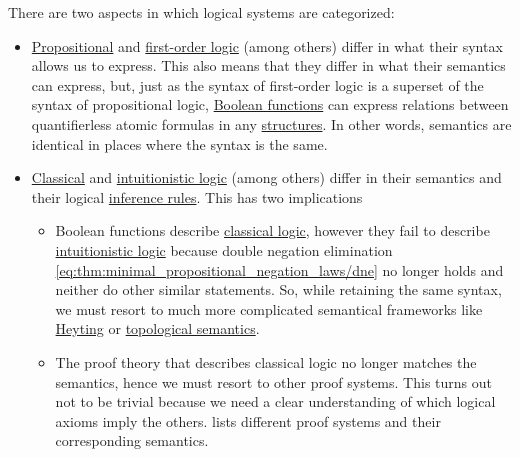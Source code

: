 There are two aspects in which logical systems are categorized:
\begin{itemize}
  \item \hyperref[subsec:propositional_logic]{Propositional} and \hyperref[subsec:first_order_logic]{first-order logic} (among others) differ in what their syntax allows us to express. This also means that they differ in what their semantics can express, but, just as the syntax of first-order logic is a superset of the syntax of propositional logic, \hyperref[subsec:boolean_functions]{Boolean functions} can express relations between quantifierless atomic formulas in any \hyperref[def:first_order_structure]{structures}. In other words, semantics are identical in places where the syntax is the same.

  \item \hyperref[def:classical_logic]{Classical} and \hyperref[def:intuitionistic_logic]{intuitionistic logic} (among others) differ in their semantics and their logical \hyperref[def:judgment/inference_rule]{inference rules}. This has two implications
  \begin{itemize}
     \item Boolean functions describe \hyperref[def:classical_logic]{classical logic}, however they fail to describe \hyperref[def:intuitionistic_logic]{intuitionistic logic} because double negation elimination \eqref{eq:thm:minimal_propositional_negation_laws/dne} no longer holds and neither do other similar statements. So, while retaining the same syntax, we must resort to much more complicated semantical frameworks like \hyperref[def:propositional_heyting_algebra_semantics]{Heyting} or \hyperref[def:propositional_topological_semantics]{topological semantics}.

     \item The proof theory that describes classical logic no longer matches the semantics, hence we must resort to other proof systems. This turns out not to be trivial because we need a clear understanding of which logical axioms imply the others.  lists different proof systems and their corresponding semantics.
  \end{itemize}
\end{itemize}

